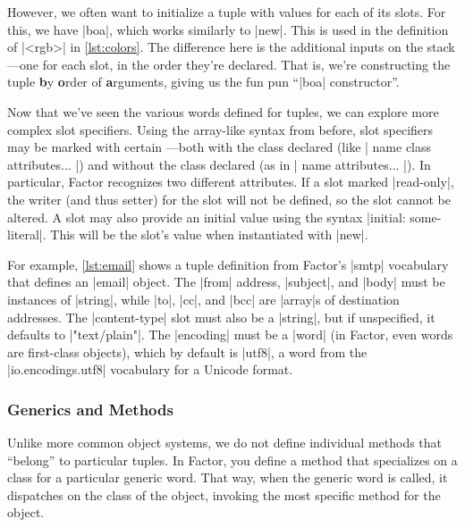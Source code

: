 However, we often want to initialize a tuple with values for each of its slots.
For this, we have \factor|boa|, which works similarly to \factor|new|.  This is
used in the definition of \factor|<rgb>| in \cref{lst:colors}.  The difference
here is the additional inputs on the stack---one for each slot, in the order
they're declared.  That is, we're constructing the tuple \textbf{b}y
\textbf{o}rder of \textbf{a}rguments, giving us the fun pun ``\factor|boa|
constructor''.


Now that we've seen the various words defined for tuples, we can explore more
complex slot specifiers.  Using the array-like syntax from before, slot
specifiers may be marked with certain ---both with the class
declared (like
%
\factor|{ name class attributes... }|)
%
and without the class declared (as in 
%
\factor|{ name attributes... }|).
%
In particular, Factor recognizes two different attributes.  If a slot marked
\factor|read-only|, the writer (and thus setter) for the slot will not be
defined, so the slot cannot be altered.  A slot may also provide an initial
value using the syntax \factor|initial: some-literal|.  This will be the slot's
value when instantiated with \factor|new|. 

For example, \cref{lst:email} shows a tuple definition from Factor's
\factor|smtp| vocabulary that defines an \factor|email| object.  The
\factor|from| address, \factor|subject|, and \factor|body| must be instances of
\factor|string|, while \factor|to|, \factor|cc|, and \factor|bcc| are
\factor|array|s of destination addresses.  The \factor|content-type| slot must
also be a \factor|string|, but if unspecified, it defaults to
\factor|"text/plain"|.  The \factor|encoding| must be a \factor|word| (in
Factor, even words are first-class objects), which by default is \factor|utf8|,
a word from the \factor|io.encodings.utf8| vocabulary for a Unicode format.

\subsubsection{Generics and Methods}

Unlike more common object systems, we do not define individual methods that
``belong'' to particular tuples.  In Factor, you define a method that
specializes on a class for a particular generic word.  That way, when the
generic word is called, it dispatches on the class of the object, invoking the
most specific method for the object.

